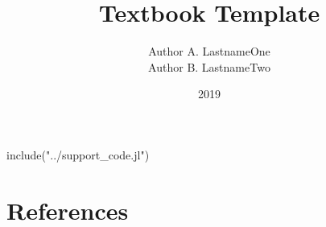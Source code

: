 \documentclass[fullbook]{tufte_algorithms_book}
\title{Textbook Template}
\author[LastnameOne and LastnameTwo]{Author A. LastnameOne \\ Author B. LastnameTwo}
\date{2019}
\begin{document}
\frontmatter



\tableofcontents


\mainmatter
\begin{jlcode}
	include("../support_code.jl")
\end{jlcode}

\appendix

\solutions
\backmatter
\chapter*{References}
\printbibliography[heading=none]

\printindex
\end{document}
